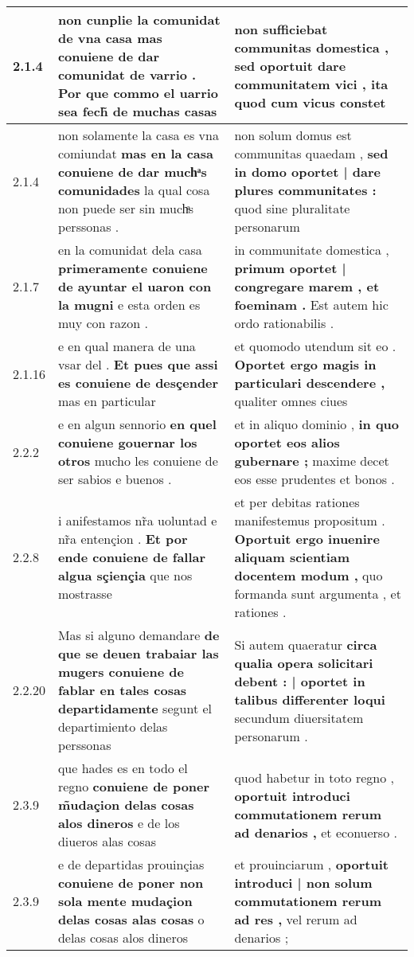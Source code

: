 \begin{tabular}{|p{1cm}|p{6.5cm}|p{6.5cm}|}
2.1.4 & non cunplie la comunidat de vna casa \textbf{ mas conuiene de dar comunidat de varrio . } Por que commo el uarrio sea fech̃ de muchas casas & non sufficiebat communitas domestica , \textbf{ sed oportuit dare communitatem vici , } ita quod cum vicus constet \\\hline
2.1.4 & non solamente la casa es vna comiundat \textbf{ mas en la casa conuiene de dar muchͣs comunidades } la qual cosa non puede ser sin muchͣs perssonas . & non solum domus est communitas quaedam , \textbf{ sed in domo oportet | dare plures communitates : } quod sine pluralitate personarum \\\hline
2.1.7 & en la comunidat dela casa \textbf{ primeramente conuiene de ayuntar el uaron con la mugni } e esta orden es muy con razon . & in communitate domestica , \textbf{ primum oportet | congregare marem , et foeminam . } Est autem hic ordo rationabilis . \\\hline
2.1.16 & e en qual manera de una vsar del . \textbf{ Et pues que assi es conuiene de desçender } mas en particular & et quomodo utendum sit eo . \textbf{ Oportet ergo magis in particulari descendere , } qualiter omnes ciues \\\hline
2.2.2 & e en algun sennorio \textbf{ en quel conuiene gouernar los otros } mucho les conuiene de ser sabios e buenos . & et in aliquo dominio , \textbf{ in quo oportet eos alios gubernare ; } maxime decet eos esse prudentes et bonos . \\\hline
2.2.8 & i anifestamos nr̃a uoluntad e nr̃a entençion . \textbf{ Et por ende conuiene de fallar algua sçiençia } que nos mostrasse & et per debitas rationes manifestemus propositum . \textbf{ Oportuit ergo inuenire aliquam scientiam docentem modum , } quo formanda sunt argumenta , et rationes . \\\hline
2.2.20 & Mas si alguno demandare \textbf{ de que se deuen trabaiar las mugers conuiene de fablar en tales cosas departidamente } segunt el departimiento delas perssonas & Si autem quaeratur \textbf{ circa qualia opera solicitari debent : | oportet in talibus differenter loqui } secundum diuersitatem personarum . \\\hline
2.3.9 & que hades es en todo el regno \textbf{ conuiene de poner m̃udaçion delas cosas alos dineros } e de los diueros alas cosas & quod habetur in toto regno , \textbf{ oportuit introduci commutationem rerum ad denarios , } et econuerso . \\\hline
2.3.9 & e de departidas prouinçias \textbf{ conuiene de poner non sola mente mudaçion delas cosas alas cosas } o delas cosas alos dineros & et prouinciarum , \textbf{ oportuit introduci | non solum commutationem rerum ad res , } vel rerum ad denarios ; \\\hline

\end{tabular}
